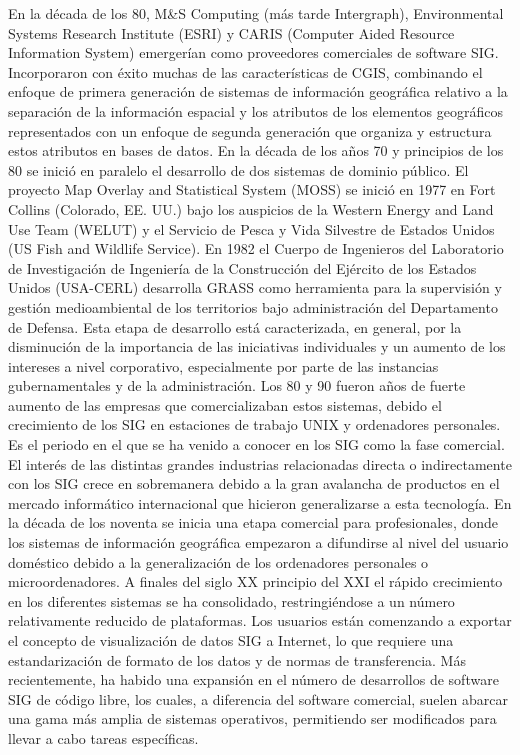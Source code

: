 En la década de los 80, M&S Computing (más tarde Intergraph), Environmental Systems Research Institute (ESRI) y CARIS (Computer Aided Resource Information System) emergerían como proveedores comerciales de software SIG. Incorporaron con éxito muchas de las características de CGIS, combinando el enfoque de primera generación de sistemas de información geográfica relativo a la separación de la información espacial y los atributos de los elementos geográficos representados con un enfoque de segunda generación que organiza y estructura estos atributos en bases de datos.
En la década de los años 70 y principios de los 80 se inició en paralelo el desarrollo de dos sistemas de dominio público. El proyecto Map Overlay and Statistical System (MOSS) se inició en 1977 en Fort Collins (Colorado, EE. UU.) bajo los auspicios de la Western Energy and Land Use Team (WELUT) y el Servicio de Pesca y Vida Silvestre de Estados Unidos (US Fish and Wildlife Service). En 1982 el Cuerpo de Ingenieros del Laboratorio de Investigación de Ingeniería de la Construcción del Ejército de los Estados Unidos (USA-CERL) desarrolla GRASS como herramienta para la supervisión y gestión medioambiental de los territorios bajo administración del Departamento de Defensa.
Esta etapa de desarrollo está caracterizada, en general, por la disminución de la importancia de las iniciativas individuales y un aumento de los intereses a nivel corporativo, especialmente por parte de las instancias gubernamentales y de la administración.
Los 80 y 90 fueron años de fuerte aumento de las empresas que comercializaban estos sistemas, debido el crecimiento de los SIG en estaciones de trabajo UNIX y ordenadores personales. Es el periodo en el que se ha venido a conocer en los SIG como la fase comercial. El interés de las distintas grandes industrias relacionadas directa o indirectamente con los SIG crece en sobremanera debido a la gran avalancha de productos en el mercado informático internacional que hicieron generalizarse a esta tecnología.
En la década de los noventa se inicia una etapa comercial para profesionales, donde los sistemas de información geográfica empezaron a difundirse al nivel del usuario doméstico debido a la generalización de los ordenadores personales o microordenadores.
A finales del siglo XX principio del XXI el rápido crecimiento en los diferentes sistemas se ha consolidado, restringiéndose a un número relativamente reducido de plataformas. Los usuarios están comenzando a exportar el concepto de visualización de datos SIG a Internet, lo que requiere una estandarización de formato de los datos y de normas de transferencia. Más recientemente, ha habido una expansión en el número de desarrollos de software SIG de código libre, los cuales, a diferencia del software comercial, suelen abarcar una gama más amplia de sistemas operativos, permitiendo ser modificados para llevar a cabo tareas específicas.
